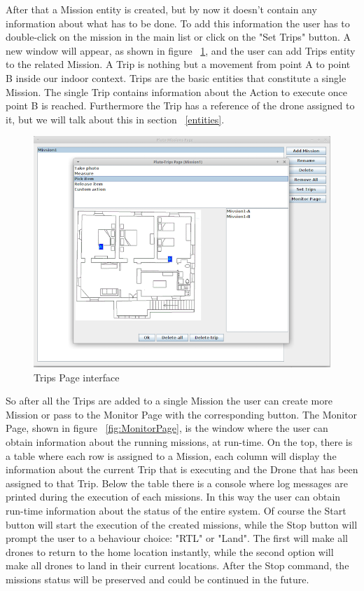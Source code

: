 After that a Mission entity is created, but by now it doesn't contain any information about what has to be done. To add this information the user has to double-click on the mission in the main list or click on the "Set Trips" button. A new window will appear, as shown in figure  ~\ref{fig:TripsPage}, and the user can add Trips entity to the related Mission. A Trip is nothing but a movement from point A to point B inside our indoor context. Trips are the basic entities that constitute a single Mission. The single Trip contains information about the Action to execute once point B is reached. Furthermore the Trip has a reference of the drone assigned to it, but we will talk about this in section ~\ref{entities}.

\begin{figure}[htb]
  \centering
  \includegraphics[width=\linewidth]{pictures/TripsPage.png}
  \caption{Trips Page interface}
  \label{fig:TripsPage}
\end{figure}

So after all the Trips are added to a single Mission the user can create more Mission or pass to the Monitor Page with the corresponding button.
The Monitor Page, shown in figure ~\ref{fig:MonitorPage}, is the window where the user can obtain information about the running missions, at run-time. On the top, there is a table where each row is assigned to a Mission, each column will display the information about the current Trip that is executing and the Drone that has been assigned to that Trip.
Below the table there is a console where log messages are printed during the execution of each missions. In this way the user can obtain run-time information about the status of the entire system. 
Of course the Start button will start the execution of the created missions, while the Stop button will prompt the user to a behaviour choice: "RTL" or "Land". The first will make all drones to return to the home location instantly, while the second option will make all drones to land in their current locations. After the Stop command, the missions status will be preserved and could be continued in the future.

